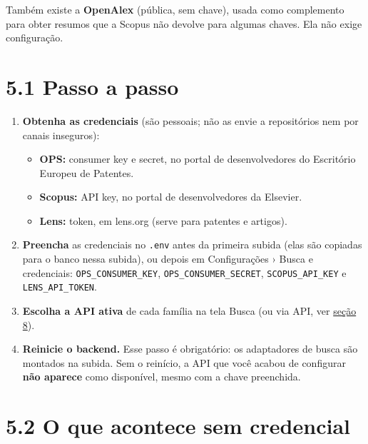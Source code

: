 \documentclass[
  brazilian,
  a4paper,12pt,oneside]{report}
\providecommand{\tightlist}{%
  \setlength{\itemsep}{0pt}\setlength{\parskip}{0pt}}
\begin{document}
Também existe a \textbf{OpenAlex} (pública, sem chave), usada como
complemento para obter resumos que a Scopus não devolve para algumas
chaves. Ela não exige configuração.

\section{5.1 Passo a passo}\label{passo-a-passo}

\begin{enumerate}
\def\labelenumi{\arabic{enumi}.}
\tightlist
\item
  \textbf{Obtenha as credenciais} (são pessoais; não as envie a
  repositórios nem por canais inseguros):

  \begin{itemize}
  \tightlist
  \item
    \textbf{OPS:} consumer key e secret, no portal de desenvolvedores do
    Escritório Europeu de Patentes.
  \item
    \textbf{Scopus:} API key, no portal de desenvolvedores da Elsevier.
  \item
    \textbf{Lens:} token, em lens.org (serve para patentes e artigos).
  \end{itemize}
\item
  \textbf{Preencha} as credenciais no
  \texttt{.}\allowbreak{}\texttt{env} antes da primeira subida (elas são
  copiadas para o banco nessa subida), ou depois em Configurações ›
  Busca e credenciais:
  \texttt{OPS\_}\allowbreak{}\texttt{CONSUMER\_}\allowbreak{}\texttt{KEY},
  \texttt{OPS\_}\allowbreak{}\texttt{CONSUMER\_}\allowbreak{}\texttt{SECRET},
  \texttt{SCOPUS\_}\allowbreak{}\texttt{API\_}\allowbreak{}\texttt{KEY}
  e
  \texttt{LENS\_}\allowbreak{}\texttt{API\_}\allowbreak{}\texttt{TOKEN}.
\item
  \textbf{Escolha a API ativa} de cada família na tela Busca (ou via
  API, ver \hyperref[8-configurauxe7uxe3o-pela-api]{seção 8}).
\item
  \textbf{Reinicie o backend.} Esse passo é obrigatório: os adaptadores
  de busca são montados na subida. Sem o reinício, a API que você acabou
  de configurar \textbf{não aparece} como disponível, mesmo com a chave
  preenchida.
\end{enumerate}

\section{5.2 O que acontece sem
credencial}\label{o-que-acontece-sem-credencial}
\end{document}
